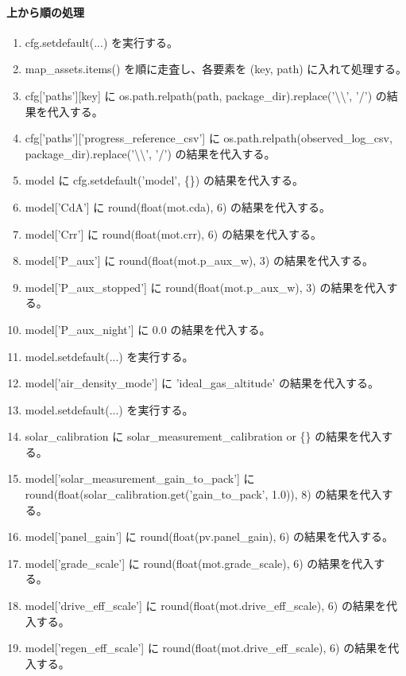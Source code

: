 \documentclass[a4paper,11pt]{article}
\begin{document}
            \paragraph{上から順の処理}
            \begin{enumerate}[leftmargin=1.8em]
            \item cfg.setdefault(...) を実行する。
\item map\_assets.items() を順に走査し、各要素を (key, path) に入れて処理する。
\item   cfg['paths'][key] に os.path.relpath(path, package\_dir).replace('\textbackslash{}\textbackslash{}', '/') の結果を代入する。
\item cfg['paths']['progress\_reference\_csv'] に os.path.relpath(observed\_log\_csv, package\_dir).replace('\textbackslash{}\textbackslash{}', '/') の結果を代入する。
\item model に cfg.setdefault('model', \{\}) の結果を代入する。
\item model['CdA'] に round(float(mot.cda), 6) の結果を代入する。
\item model['Crr'] に round(float(mot.crr), 6) の結果を代入する。
\item model['P\_aux'] に round(float(mot.p\_aux\_w), 3) の結果を代入する。
\item model['P\_aux\_stopped'] に round(float(mot.p\_aux\_w), 3) の結果を代入する。
\item model['P\_aux\_night'] に 0.0 の結果を代入する。
\item model.setdefault(...) を実行する。
\item model['air\_density\_mode'] に 'ideal\_gas\_altitude' の結果を代入する。
\item model.setdefault(...) を実行する。
\item solar\_calibration に solar\_measurement\_calibration or \{\} の結果を代入する。
\item model['solar\_measurement\_gain\_to\_pack'] に round(float(solar\_calibration.get('gain\_to\_pack', 1.0)), 8) の結果を代入する。
\item model['panel\_gain'] に round(float(pv.panel\_gain), 6) の結果を代入する。
\item model['grade\_scale'] に round(float(mot.grade\_scale), 6) の結果を代入する。
\item model['drive\_eff\_scale'] に round(float(mot.drive\_eff\_scale), 6) の結果を代入する。
\item model['regen\_eff\_scale'] に round(float(mot.drive\_eff\_scale), 6) の結果を代入する。

\end{enumerate}
\end{document}
